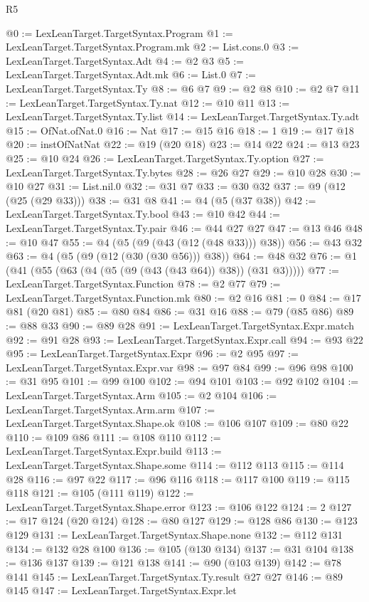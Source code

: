 \begin{lexlean}{R5}
\begin{coremodule}
@0 := LexLeanTarget.TargetSyntax.Program
@1 := LexLeanTarget.TargetSyntax.Program.mk
@2 := List.cons.{0}
@3 := LexLeanTarget.TargetSyntax.Adt
@4 := @2 @3
@5 := LexLeanTarget.TargetSyntax.Adt.mk
@6 := List.{0}
@7 := LexLeanTarget.TargetSyntax.Ty
@8 := @6 @7
@9 := @2 @8
@10 := @2 @7
@11 := LexLeanTarget.TargetSyntax.Ty.nat
@12 := @10 @11
@13 := LexLeanTarget.TargetSyntax.Ty.list
@14 := LexLeanTarget.TargetSyntax.Ty.adt
@15 := OfNat.ofNat.{0}
@16 := Nat
@17 := @15 @16
@18 := 1
@19 := @17 @18
@20 := instOfNatNat
@22 := @19 (@20 @18)
@23 := @14 @22
@24 := @13 @23
@25 := @10 @24
@26 := LexLeanTarget.TargetSyntax.Ty.option
@27 := LexLeanTarget.TargetSyntax.Ty.bytes
@28 := @26 @27
@29 := @10 @28
@30 := @10 @27
@31 := List.nil.{0}
@32 := @31 @7
@33 := @30 @32
@37 := @9 (@12 (@25 (@29 @33)))
@38 := @31 @8
@41 := @4 (@5 (@37 @38))
@42 := LexLeanTarget.TargetSyntax.Ty.bool
@43 := @10 @42
@44 := LexLeanTarget.TargetSyntax.Ty.pair
@46 := @44 @27 @27
@47 := @13 @46
@48 := @10 @47
@55 := @4 (@5 (@9 (@43 (@12 (@48 @33))) @38))
@56 := @43 @32
@63 := @4 (@5 (@9 (@12 (@30 (@30 @56))) @38))
@64 := @48 @32
@76 := @1 (@41 (@55 (@63 (@4 (@5 (@9 (@43 (@43 @64)) @38)) (@31 @3)))))
@77 := LexLeanTarget.TargetSyntax.Function
@78 := @2 @77
@79 := LexLeanTarget.TargetSyntax.Function.mk
@80 := @2 @16
@81 := 0
@84 := @17 @81 (@20 @81)
@85 := @80 @84
@86 := @31 @16
@88 := @79 (@85 @86)
@89 := @88 @33
@90 := @89 @28
@91 := LexLeanTarget.TargetSyntax.Expr.match
@92 := @91 @28
@93 := LexLeanTarget.TargetSyntax.Expr.call
@94 := @93 @22
@95 := LexLeanTarget.TargetSyntax.Expr
@96 := @2 @95
@97 := LexLeanTarget.TargetSyntax.Expr.var
@98 := @97 @84
@99 := @96 @98
@100 := @31 @95
@101 := @99 @100
@102 := @94 @101
@103 := @92 @102
@104 := LexLeanTarget.TargetSyntax.Arm
@105 := @2 @104
@106 := LexLeanTarget.TargetSyntax.Arm.arm
@107 := LexLeanTarget.TargetSyntax.Shape.ok
@108 := @106 @107
@109 := @80 @22
@110 := @109 @86
@111 := @108 @110
@112 := LexLeanTarget.TargetSyntax.Expr.build
@113 := LexLeanTarget.TargetSyntax.Shape.some
@114 := @112 @113
@115 := @114 @28
@116 := @97 @22
@117 := @96 @116
@118 := @117 @100
@119 := @115 @118
@121 := @105 (@111 @119)
@122 := LexLeanTarget.TargetSyntax.Shape.error
@123 := @106 @122
@124 := 2
@127 := @17 @124 (@20 @124)
@128 := @80 @127
@129 := @128 @86
@130 := @123 @129
@131 := LexLeanTarget.TargetSyntax.Shape.none
@132 := @112 @131
@134 := @132 @28 @100
@136 := @105 (@130 @134)
@137 := @31 @104
@138 := @136 @137
@139 := @121 @138
@141 := @90 (@103 @139)
@142 := @78 @141
@145 := LexLeanTarget.TargetSyntax.Ty.result @27 @27
@146 := @89 @145
@147 := LexLeanTarget.TargetSyntax.Expr.let

\end{coremodule}
\end{lexlean}
